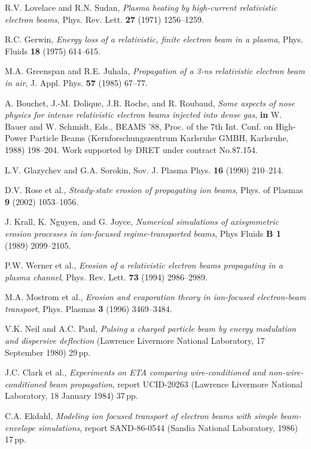 \documentclass [12pt,a4paper,     ]{report} %
\begin{document}
\begin{enumerate}
 R.V. Lovelace and R.N. Sudan, \emph{Plasma heating by high-current relativistic electron beams}, Phys. Rev. Lett. {\bf 27} (1971) 1256--1259.

 R.C. Gerwin, \emph{Energy loss of a relativistic, finite electron beam in a plasma}, Phys. Fluids {\bf 18} (1975) 614--615.

 M.A. Greenspan and R.E. Juhala, \emph{Propagation of a 3-ns relativistic electron beam in air}, J. Appl. Phys. {\bf 57} (1985) 67--77.

 A. Bouchet, J.-M. Dolique, J.R. Roche, and R. Roubaud, \emph{Some aspects of nose physics for intense relativistic electron beams injected into dense gas}, {\bf in} W. Bauer and W. Schmidt, Eds., BEAMS '88, Proc. of the 7th Int. Conf. on High-Power Particle Beams (Kernforschungszentrum Karlsruhe GMBH, Karlsruhe, 1988) 198--204. Work supported by DRET under contract No.87.154.

 L.V. Glazychev and G.A. Sorokin, Sov. J. Plasma Phys. {\bf 16} (1990) 210--214.

 D.V. Rose et al., \emph{Steady-state erosion of propagating ion beams}, Phys. of Plasmas {\bf 9} (2002) 1053--1056.

 J. Krall, K. Nguyen, and G. Joyce, \emph{Numerical simulations of axisymmetric erosion processes in ion-focused regime-transported beams}, Phys Fluids {\bf B 1} (1989) 2099--2105.

 P.W. Werner et al., \emph{Erosion of a relativistic electron beams propagating in a plasma channel}, Phys. Rev. Lett. {\bf 73} (1994) 2986--2989.

 M.A. Mostrom et al., \emph{Erosion and evaporation theory in ion-focused electron-beam transport}, Phys. Plasmas {\bf 3} (1996) 3469--3484.




 V.K. Neil and A.C. Paul, \emph{Pulsing a charged particle beam by energy modulation and dispersive deflection} (Lawrence Livermore National Laboratory, 17 September 1980) 29\,pp.

 J.C. Clark et al., \emph{Experiments on ETA comparing wire-conditioned and non-wire-conditioned beam propagation}, report UCID-20263 (Lawrence Livermore National Laboratory, 18 January 1984) 37\,pp.

 C.A. Ekdahl, \emph{Modeling ion focused transport of electron beams with simple beam-envelope simulations}, report SAND-86-0544 (Sandia National Laboratory, 1986) 17\,pp.


\end{enumerate}
\end{document}
